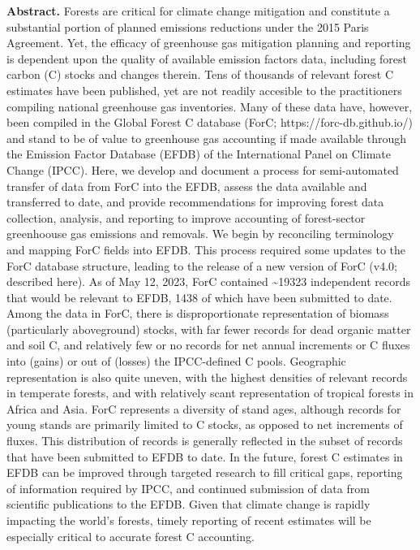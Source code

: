 \documentclass[, manuscript]{copernicus}
\begin{document}
\textbf{Abstract.} Forests are critical for climate change mitigation
and constitute a substantial portion of planned emissions reductions
under the 2015 Paris Agreement. Yet, the efficacy of greenhouse gas
mitigation planning and reporting is dependent upon the quality of
available emission factors data, including forest carbon (C) stocks and
changes therein. Tens of thousands of relevant forest C estimates have
been published, yet are not readily accesible to the practitioners
compiling national greenhouse gas inventories. Many of these data have,
however, been compiled in the Global Forest C database (ForC;
https://forc-db.github.io/) and stand to be of value to greenhouse gas
accounting if made available through the Emission Factor Database (EFDB)
of the International Panel on Climate Change (IPCC). Here, we develop
and document a process for semi-automated transfer of data from ForC
into the EFDB, assess the data available and transferred to date, and
provide recommendations for improving forest data collection, analysis,
and reporting to improve accounting of forest-sector greenhoouse gas
emissions and removals. We begin by reconciling terminology and mapping
ForC fields into EFDB. This process required some updates to the ForC
database structure, leading to the release of a new version of ForC
(v4.0; described here). As of May 12, 2023, ForC contained
\textasciitilde19323 independent records that would be relevant to EFDB,
1438 of which have been submitted to date. Among the data in ForC, there
is disproportionate representation of biomass (particularly aboveground)
stocks, with far fewer records for dead organic matter and soil C, and
relatively few or no records for net annual increments or C fluxes into
(gains) or out of (losses) the IPCC-defined C pools. Geographic
representation is also quite uneven, with the highest densities of
relevant records in temperate forests, and with relatively scant
representation of tropical forests in Africa and Asia. ForC represents a
diversity of stand ages, although records for young stands are primarily
limited to C stocks, as opposed to net increments of fluxes. This
distribution of records is generally reflected in the subset of records
that have been submitted to EFDB to date. In the future, forest C
estimates in EFDB can be improved through targeted research to fill
critical gaps, reporting of information required by IPCC, and continued
submission of data from scientific publications to the EFDB. Given that
climate change is rapidly impacting the world's forests, timely
reporting of recent estimates will be especially critical to accurate
forest C accounting.
\end{document}
